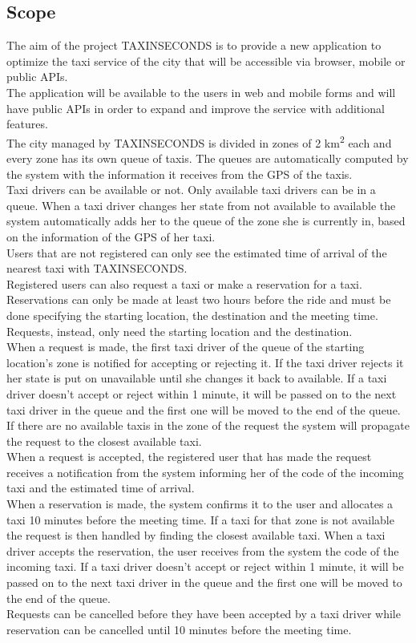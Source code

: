 \documentclass{article}
\begin{document}
\subsection{Scope}
The aim of the project TAXINSECONDS is to provide a new application to optimize the taxi service of the city that will be accessible via browser, mobile or public APIs.
\\The application will be available to the users in web and mobile forms and will have public APIs in order to expand and improve the service with additional features.
\\The city managed by TAXINSECONDS is divided in zones of 2 km\textsuperscript{2} each and every zone has its own queue of taxis. The queues are automatically computed by the system with the information it receives from the GPS of the taxis. 
\\Taxi drivers can be available or not. Only available taxi drivers can be in a queue. When a taxi driver changes her state from not available to available the system automatically adds her to the queue of the zone she is currently in, based on the information of the GPS of her taxi. 
\\Users that are not registered can only see the estimated time of arrival of the nearest taxi with TAXINSECONDS.\@
\\Registered users can also request a taxi or make a reservation for a taxi. Reservations can only be made at least two hours before the ride and must be done specifying the starting location, the destination and the meeting time. Requests, instead, only need the starting location and the destination.
\\When a request is made, the first taxi driver of the queue of the starting location's zone is notified for accepting or rejecting it. If the taxi driver rejects it her state is put on unavailable until she changes it back to available. If a taxi driver doesn't accept or reject within 1 minute, it will be passed on to the next taxi driver in the queue and the first one will be moved to the end of the queue. If there are no available taxis in the zone of the request the system will propagate the request to the closest available taxi.
\\When a request is accepted, the registered user that has made the request receives a notification from the system informing her of the code of the incoming taxi and the estimated time of arrival.
\\When a reservation is made, the system confirms it to the user and allocates a taxi 10 minutes before the meeting time. If a taxi for that zone is not available the request is then handled by finding the closest available taxi. When a taxi driver accepts the reservation, the user receives from the system the code of the incoming taxi. If a taxi driver doesn't accept or reject within 1 minute, it will be passed on to the next taxi driver in the queue and the first one will be moved to the end of the queue.
\\Requests can be cancelled before they have been accepted by a taxi driver while reservation can be cancelled until 10 minutes before the meeting time.
\end{document}

